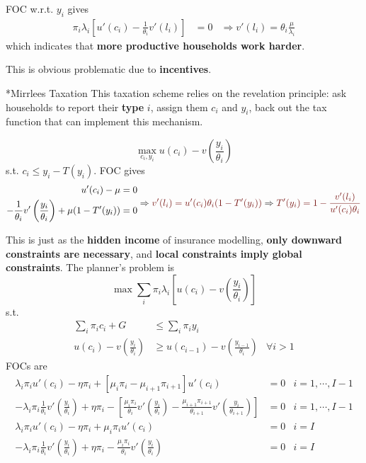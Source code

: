 \documentclass[10pt,landscape,a4paper]{article}
\makeatletter
\renewcommand{\subsubsection}{\@startsection{subsubsection}{1}{0mm}{.2ex}{.2ex}{\bfseries}}
\makeatother
\begin{document}
\begin{multicols*}{3}
FOC w.r.t. $y_i$ gives
\begin{align*}
    \pi_i\lambda_i\left[u'(c_i)-\frac{1}{\theta_i}v'(l_i)\right] &=0 &\Rightarrow v'(l_i)=\theta_i \frac{\mu}{\lambda_i}
\end{align*}
which indicates that \textbf{more productive households work harder}.

This is obvious problematic due to \textbf{incentives}.

\subsubsection*{Mirrlees Taxation}
This taxation scheme relies on the revelation principle: ask households to report their \textbf{type} $i$, assign them $c_i$ and $y_i$, back out the tax function that can implement this mechanism. 

$$
\max_{c_i,y_i}u(c_i) - v\left(\frac{y_i}{\theta_i}\right)
$$
s.t. $c_i\leq y_i-T(y_i)$. FOC gives
$$
\begin{aligned}
    u'(c_i)-\mu&=0\\
    -\frac{1}{\theta_i}v'\left(\frac{y_i}{\theta_i}\right)+\mu(1-T'(y_i)) &=0
\end{aligned}\Rightarrow {\color{myred}v'(l_i) = u'(c_i)\theta_i(1-T'(y_i))} \Rightarrow {\color{myred}T'(y_i) = 1-\frac{v'(l_i)}{u'(c_i)\theta_i}}
$$

This is just as the \textbf{hidden income} of insurance modelling, \textbf{only downward constraints are necessary}, and \textbf{local constraints imply global constraints}. The planner's problem is
$$
\max \sum_i \pi_i\lambda_i \left[u(c_i)-v\left(\frac{y_i}{\theta_i}\right)\right]
$$
s.t.
\begin{align*}
    \sum_i\pi_i c_i +G &\leq \sum_i\pi_i y_i \\
    u(c_i)- v\left(\frac{y_i}{\theta_i}\right) &\geq u(c_{i-1})-v\left(\frac{y_{i-1}}{\theta_i}\right) &\forall i >1
\end{align*}
FOCs are 
\begin{align*}
    \lambda_i \pi_i u'(c_i)-\eta \pi_i+\left[\mu_i\pi_i-\mu_{i+1}\pi_{i+1}\right]u'(c_i) &=0 & i=1,\cdots,I-1\\
    -\lambda_i\pi_i \frac{1}{\theta_i}v'(\frac{y_i}{\theta_i}) + \eta\pi_i - \left[ \frac{\mu_i\pi_i}{\theta_i}v'\left(\frac{y_i}{\theta_i}\right) - \frac{\mu_{i+1}\pi_{i+1}}{\theta_{i+1}}v'\left(\frac{y_i}{\theta_{i+1}}\right) \right] &=0 & i=1,\cdots,I-1\\
    \lambda_i\pi_iu'(c_i)-\eta\pi_i +\mu_i\pi_iu'(c_i)&=0 &i=I\\
    -\lambda_i\pi_i \frac{1}{\theta_i}v'\left(\frac{y_i}{\theta_i}\right) + \eta\pi_i - \frac{\mu_i\pi_i}{\theta_i}v'\left(\frac{y_i}{\theta_i}\right) &=0 & i=I
\end{align*}


\end{multicols*}
\end{document}
